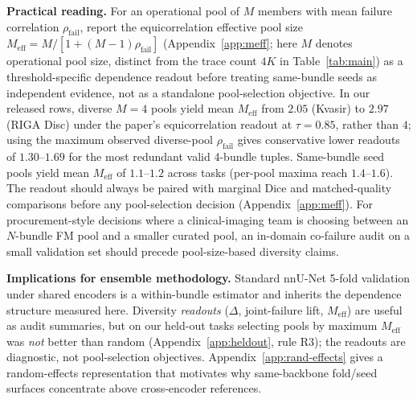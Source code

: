 \documentclass{article}
\begin{document}
\textbf{Practical reading.} For an operational pool of $M$ members with mean failure correlation $\rho_{\mathrm{fail}}$, report the equicorrelation effective pool size $M_{\mathrm{eff}}=M/[1+(M-1)\rho_{\mathrm{fail}}]$ (Appendix~\ref{app:meff}; here $M$ denotes operational pool size, distinct from the trace count $4K$ in Table~\ref{tab:main}) as a threshold-specific dependence readout before treating same-bundle seeds as independent evidence, not as a standalone pool-selection objective. In our released rows, diverse $M{=}4$ pools yield mean $M_{\mathrm{eff}}$ from $2.05$ (Kvasir) to $2.97$ (RIGA Disc) under the paper's equicorrelation readout at $\tau=0.85$, rather than $4$; using the maximum observed diverse-pool $\rho_{\mathrm{fail}}$ gives conservative lower readouts of $1.30$--$1.69$ for the most redundant valid 4-bundle tuples. Same-bundle seed pools yield mean $M_{\mathrm{eff}}$ of $1.1$--$1.2$ across tasks (per-pool maxima reach $1.4$--$1.6$). The readout should always be paired with marginal Dice and matched-quality comparisons before any pool-selection decision (Appendix~\ref{app:meff}). For procurement-style decisions where a clinical-imaging team is choosing between an $N$-bundle FM pool and a smaller curated pool, an in-domain co-failure audit on a small validation set should precede pool-size-based diversity claims.

\textbf{Implications for ensemble methodology.} Standard nnU-Net 5-fold validation under shared encoders is a within-bundle estimator and inherits the dependence structure measured here. Diversity \emph{readouts} ($\Delta$, joint-failure lift, $M_{\mathrm{eff}}$) are useful as audit summaries, but on our held-out tasks selecting pools by maximum $M_{\mathrm{eff}}$ was \emph{not} better than random (Appendix~\ref{app:heldout}, rule R3); the readouts are diagnostic, not pool-selection objectives. Appendix~\ref{app:rand-effects} gives a random-effects representation that motivates why same-backbone fold/seed surfaces concentrate above cross-encoder references.
\end{document}
